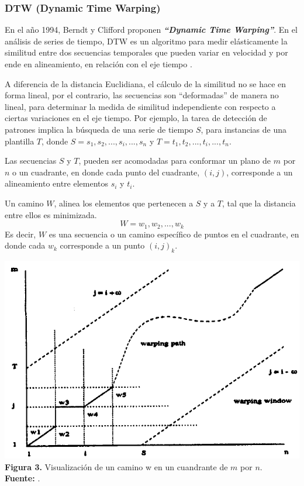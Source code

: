 \subsubsection{DTW (Dynamic Time Warping)}
En el a\~no 1994, Berndt y Clifford \cite{dtw} proponen \textit{\textbf{\enquote{Dynamic Time Warping}}}. En el an\'alisis de series de tiempo, DTW es un algoritmo para medir el\'asticamente la similitud entre dos secuencias temporales que pueden variar en velocidad y por ende en alineamiento, en relaci\'on con el eje tiempo \cite{concepts}.\par A diferencia de la distancia Euclidiana, el c\'alculo de la similitud no se hace en forma lineal, por el contrario, las secuencias son \enquote{deformadas} de manera no lineal, para determinar la medida de similitud independiente con respecto a ciertas variaciones en el eje tiempo. Por ejemplo, la tarea de detecci\'on de patrones implica la b\'usqueda de una serie de tiempo $S$, para instancias de una plantilla $T$, donde $S = s_1, s_2, ..., s_i, ..., s_n$ y $T = t_1, t_2, ..., t_i, ..., t_n$.\par
Las secuencias $S$ y $T$, pueden ser acomodadas para conformar un plano de $m$ por $n$ o un cuadrante, en donde cada punto del cuadrante, $(i, j)$, corresponde a un alineamiento entre elementos $s_i$ y $t_i$.\par
Un camino $W$, alinea los elementos que pertenecen a $S$ y a $T$, tal que la distancia entre ellos es minimizada.\\
\begin{equation}
W = w_1, w_2, ..., w_k
\end{equation}
Es decir, $W$ es una secuencia o un camino espec\'ifico de puntos en el cuadrante, en donde cada $w_k$ corresponde a un punto $(i,j)_k$.
\begin{center}
\includegraphics[scale=0.7]{dtw.png}\\
\vspace*{10pt}
\footnotesize{\textbf{Figura 3.} Visualizaci\'on de un camino w en un cuandrante de $m$ por $n$.}\\ \textbf{Fuente:} \cite{dtw}.
\end{center}
